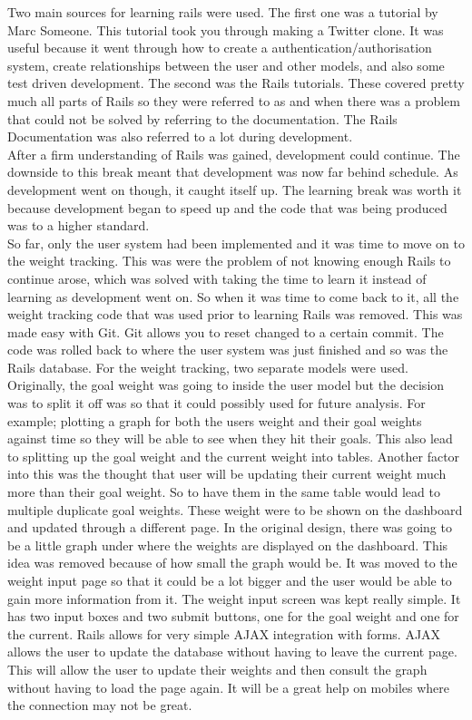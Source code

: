 Two main sources for learning rails were used. The first one was a tutorial by Marc Someone. This tutorial took you through making a Twitter \citep{twitter:2006} clone. It was useful because it went through how to create a authentication/authorisation system, create relationships between the user and other models, and also some test driven development. The second was the Rails tutorials. These covered pretty much all parts of Rails so they were referred to as and when there was a problem that could not be solved by referring to the documentation. The Rails Documentation was also referred to a lot during development.\\

After a firm understanding of Rails was gained, development could continue. The downside to this break meant that development was now far behind schedule. As development went on though, it caught itself up. The learning break was worth it because development began to speed up and the code that was being produced was to a higher standard.\\

So far, only the user system had been implemented and it was time to move on to the weight tracking. This was were the problem of not knowing enough Rails to continue arose, which was solved with taking the time to learn it instead of learning as development went on. So when it was time to come back to it, all the weight tracking code that was used prior to learning Rails was removed. This was made easy with Git. Git allows you to reset changed to a certain commit. The code was rolled back to where the user system was just finished and so was the Rails database. For the weight tracking, two separate models were used. Originally, the goal weight was going to inside the user model but the decision was to split it off was so that it could possibly used for future analysis. For example; plotting a graph for both the users weight and their goal weights against time so they will be able to see when they hit their goals. This also lead to splitting up the goal weight and the current weight into tables. Another factor into this was the thought that user will be updating their current weight much more than their goal weight. So to have them in the same table would lead to multiple duplicate goal weights. These weight were to be shown on the dashboard and updated through a different page. In the original design, there was going to be a little graph under where the weights are displayed on the dashboard. This idea was removed because of how small the graph would be. It was moved to the weight input page so that it could be a lot bigger and the user would be able to gain more information from it. The weight input screen was kept really simple. It has two input boxes and two submit buttons, one for the goal weight and one for the current. Rails allows for very simple AJAX integration with forms. AJAX allows the user to update the database without having to leave the current page. This will allow the user to update their weights and then consult the graph without having to load the page again. It will be a great help on mobiles where the connection may not be great.\\

